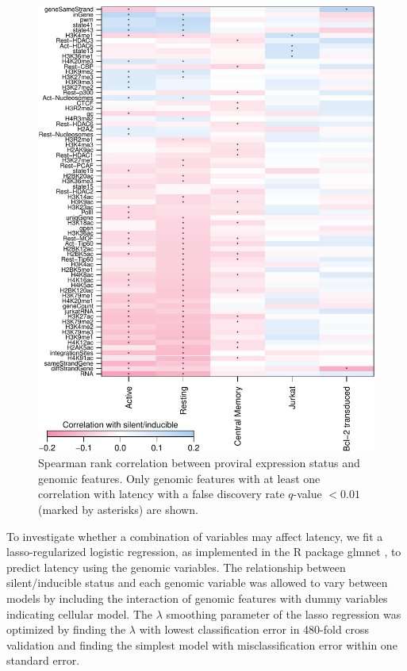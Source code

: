 \documentclass[../sherrill-Mix_thesis.tex]{subfiles}
\begin{document}
	\begin{figure}
		\centering
			\includegraphics[width=\textwidth]{variableCorrelationDerep.pdf} %
		\caption[Correlations of genomic features and latency]{Spearman rank correlation between proviral expression status and genomic features. Only genomic features with at least one correlation with latency with a false discovery rate $q$-value $<0.01$ (marked by asterisks) are shown.}
		\label{cor}
	\end{figure}

		To investigate whether a combination of variables may affect latency, we fit a lasso-regularized logistic regression, as implemented in the R package glmnet \citep{Friedman2010}, to predict latency using the genomic variables. The relationship between silent/inducible status and each genomic variable was allowed to vary between models by including the interaction of genomic features with dummy variables indicating cellular model. The $\lambda$ smoothing parameter of the lasso regression was optimized by finding the $\lambda$ with lowest classification error in 480-fold cross validation and finding the simplest model with misclassification error within one standard error.
\end{document}
